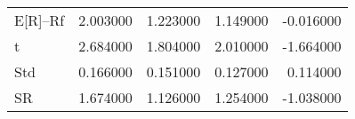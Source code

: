 \begin{tabular}{lrrrr}
\toprule
\midrule
E[R]--Rf & 2.003000 & 1.223000 & 1.149000 & -0.016000 \\
t & 2.684000 & 1.804000 & 2.010000 & -1.664000 \\
Std & 0.166000 & 0.151000 & 0.127000 & 0.114000 \\
SR & 1.674000 & 1.126000 & 1.254000 & -1.038000 \\
\bottomrule
\end{tabular}

